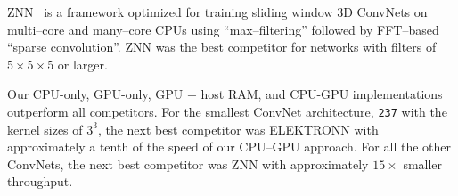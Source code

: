 \documentclass[conference]{./IEEEtran/IEEEtran}
\begin{document}
  ZNN~\cite{zlateski2015znn} is a framework optimized for training
  sliding window 3D ConvNets on multi--core and many--core CPUs using
  ``max--filtering'' followed by FFT--based ``sparse convolution''.
  ZNN was the best competitor for networks with filters of $5 \times 5
  \times 5$ or larger.

  Our CPU-only, GPU-only, GPU + host RAM, and CPU-GPU implementations
  outperform all competitors.  For the smallest ConvNet architecture,
  {\tt 237} with the kernel sizes of $3^3$, the next best competitor
  was ELEKTRONN with approximately a tenth of the speed of our
  CPU--GPU approach. For all the other ConvNets, the next best
  competitor was ZNN with approximately $15 \times$ smaller
  throughput.







\end{document}
